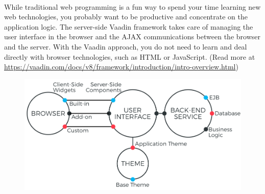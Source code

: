 \documentclass{article}
\begin{document}
			\paragraph{}While traditional web programming is a fun way to spend your time learning new web technologies, you probably want to be productive and concentrate on the application logic. The server-side Vaadin framework takes care of managing the user interface in the browser and the AJAX communications between the browser and the server. With the Vaadin approach, you do not need to learn and deal directly with browser technologies, such as HTML or JavaScript. (Read more at \href{https://vaadin.com/docs/v8/framework/introduction/intro-overview.html}{https://vaadin.com/docs/v8/framework/introduction/intro-overview.html})
			\begin{figure}[H]
			\begin{center}
			\includegraphics[width=.8\linewidth]{Images/Appendix/vaadin2.png}
			\label{fig:V2}
			\end{center}
			\end{figure}
\end{document}
